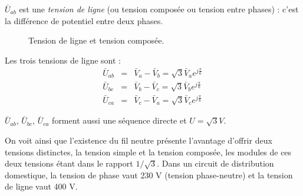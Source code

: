 $\bar{U}_{ab}$ est une {\em tension de ligne} (ou tension composée ou
tension entre phases) : c'est la différence de potentiel entre deux
phases.
\begin{figure}[ht]
\begin{center}
	
	\caption{Tension de ligne et tension composée.}
\end{center}
\end{figure}
Les trois tensions de ligne sont :
\begin{eqnarray*}
	\bar{U}_{ab}& =&
	\bar{V}_a-\bar{V}_b=\sqrt{3}\bar{V}_ae^{j\frac{\pi}{6}}\\
	\bar{U}_{bc}& =& \bar{V}_b-\bar{V}_c=\sqrt{3}\bar{V}_be^{j\frac{\pi}{6}}\\
	\bar{U}_{ca}& =& \bar{V}_c-\bar{V}_a=\sqrt{3}\bar{V}_ce^{j\frac{\pi}{6}}\
\end{eqnarray*}
\begin{marginfigure}
	
	\caption{Phaseurs des tensions de ligne et tensions composées.}
\end{marginfigure}
$\bar{U}_{ab}$, $\bar{U}_{bc}$, $\bar{U}_{ca}$ forment aussi une
séquence directe et $U=\sqrt{3}V$.

On voit ainsi que l'existence du fil neutre présente l'avantage d'offrir deux tensions distinctes, la tension simple et la tension composée, les modules de ces deux tensions étant dans le rapport $1/\sqrt{3}$.
Dans un circuit de distribution domestique, la tension de phase vaut 230 V (tension phase-neutre) et la tension de ligne vaut 400 V.

